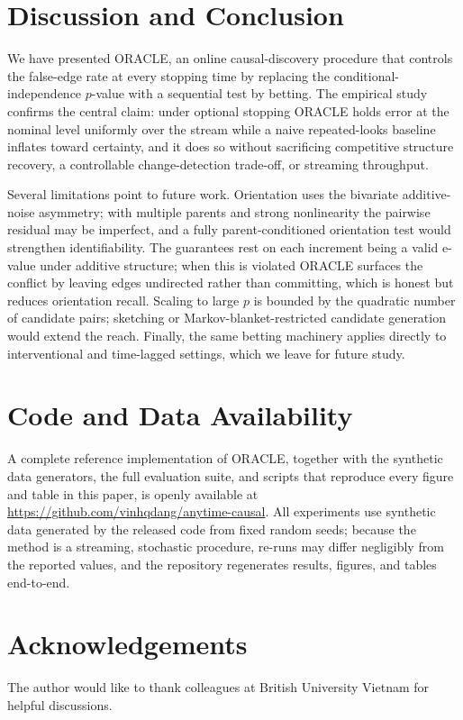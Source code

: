 \documentclass[preprint,12pt,authoryear]{elsarticle}
\begin{document}









\section{Discussion and Conclusion}
\label{sec:conclusion}
We have presented ORACLE, an online causal-discovery procedure that controls the
false-edge rate at every stopping time by replacing the conditional-independence
$p$-value with a sequential test by betting. The empirical study confirms the
central claim: under optional stopping ORACLE holds error at the nominal level
uniformly over the stream while a naive repeated-looks baseline inflates toward
certainty, and it does so without sacrificing competitive structure recovery,
a controllable change-detection trade-off, or streaming throughput.

Several limitations point to future work. Orientation uses the bivariate
additive-noise asymmetry; with multiple parents and strong nonlinearity the
pairwise residual may be imperfect, and a fully parent-conditioned orientation
test would strengthen identifiability. The guarantees rest on each increment
being a valid e-value under additive structure; when this is violated ORACLE
surfaces the conflict by leaving edges undirected rather than committing, which
is honest but reduces orientation recall. Scaling to large $p$ is bounded by the
quadratic number of candidate pairs; sketching or Markov-blanket-restricted
candidate generation would extend the reach. Finally, the same betting machinery
applies directly to interventional and time-lagged settings, which we leave for
future study.

\section*{Code and Data Availability}
A complete reference implementation of ORACLE, together with the synthetic data
generators, the full evaluation suite, and scripts that reproduce every figure
and table in this paper, is openly available at
\url{https://github.com/vinhqdang/anytime-causal}. All experiments use synthetic
data generated by the released code from fixed random seeds; because the method
is a streaming, stochastic procedure, re-runs may differ negligibly from the
reported values, and the repository regenerates results, figures, and tables
end-to-end.

\section*{Acknowledgements}
The author would like to thank colleagues at British University Vietnam for
helpful discussions.



\end{document}

